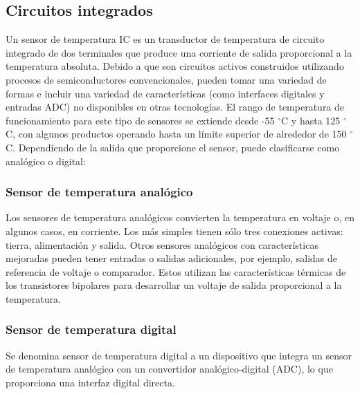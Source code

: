 	\subsection{Circuitos integrados}
	Un sensor de temperatura IC es un transductor de temperatura de circuito integrado de dos terminales que produce una corriente de salida proporcional a la temperatura absoluta. Debido a que son circuitos activos construidos utilizando procesos de semiconductores convencionales, pueden tomar una variedad de formas e incluir una variedad de características (como interfaces digitales y entradas ADC) no disponibles en otras tecnologías. El rango de temperatura de funcionamiento para este tipo de sensores se extiende desde -55 $^{\circ}$C y hasta 125 $^{\circ}$C, con algunos productos operando hasta un límite superior de alrededor de 150 $^{\circ}$C. Dependiendo de la salida que proporcione el sensor, puede clasificarse como analógico o digital:
	
	\subsubsection{Sensor de temperatura analógico}
				Los sensores de temperatura analógicos convierten la temperatura en voltaje o, en algunos casos, en corriente. Los más simples tienen sólo tres conexiones activas: tierra, alimentación y salida. Otros sensores analógicos con características mejoradas pueden tener entradas o salidas adicionales, por ejemplo, salidas de referencia de voltaje o comparador. Estos utilizan las características térmicas de los transistores bipolares para desarrollar un voltaje de salida proporcional a la temperatura.
				
	\subsubsection{Sensor de temperatura digital}
	Se denomina sensor de temperatura digital a un dispositivo que integra un sensor de temperatura analógico con un convertidor analógico-digital (ADC), lo que proporciona una interfaz digital directa.\\
				
